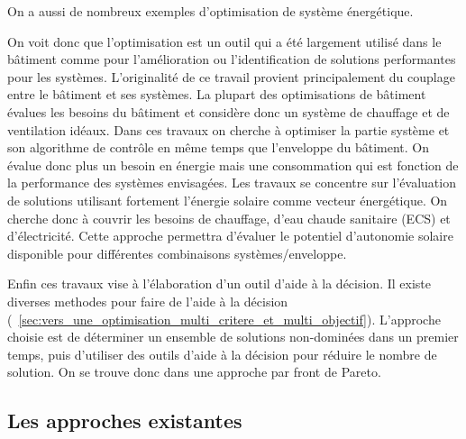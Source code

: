 On a aussi de nombreux exemples d’optimisation de système énergétique.

On voit donc que l’optimisation est un outil qui a été largement utilisé dans
le bâtiment comme pour l’amélioration ou l’identification de solutions performantes
pour les systèmes.
L’originalité de ce travail provient principalement du couplage entre le bâtiment
et ses systèmes. La plupart des optimisations de bâtiment évalues les besoins
du bâtiment et considère donc un système de chauffage et de ventilation idéaux.
Dans ces travaux on cherche à optimiser la partie système et son algorithme de
contrôle en même temps que l’enveloppe du bâtiment. On évalue donc plus un besoin
en énergie mais une consommation qui est fonction de la performance des systèmes
envisagées. Les travaux se concentre sur l’évaluation de solutions utilisant fortement
l’énergie solaire comme vecteur énergétique. On cherche donc à couvrir les besoins
de chauffage, d’eau chaude sanitaire (ECS) et d’électricité.
Cette approche permettra d’évaluer le potentiel d’autonomie solaire disponible
pour différentes combinaisons systèmes/enveloppe.

Enfin ces travaux vise à l’élaboration d’un outil d’aide à la décision. Il existe
diverses methodes pour faire de l’aide à la décision (~\autoref{sec:vers_une_optimisation_multi_critere_et_multi_objectif}).
L’approche choisie est de déterminer un
ensemble de solutions non-dominées dans un premier temps, puis d’utiliser des
outils d’aide à la décision pour réduire le nombre de solution. On se trouve donc
dans une approche par front de Pareto.



\subsection{Les approches existantes} %
\label{sub:les_approches_existantes}


